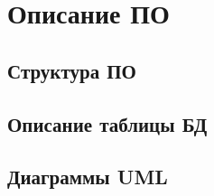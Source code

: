 \chapter{Описание ПО}
\label{ch:impl}

\section{Структура ПО}

\section{Описание таблицы БД} %

\section{Диаграммы UML} %
